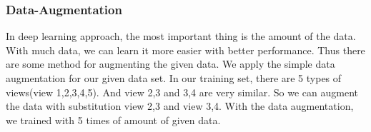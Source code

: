 \subsubsection{Data-Augmentation}
In deep learning approach, the most important thing is the amount of the data. With much data, we can learn it more easier with better performance. Thus there are some method for augmenting the given data. We apply the simple data augmentation for our given data set. In our training set, there are 5 types of views(view 1,2,3,4,5). And view 2,3 and 3,4 are very similar.  So we can augment the data with substitution view 2,3 and view 3,4. With the data augmentation, we trained with 5 times of amount of given data.

%
%
